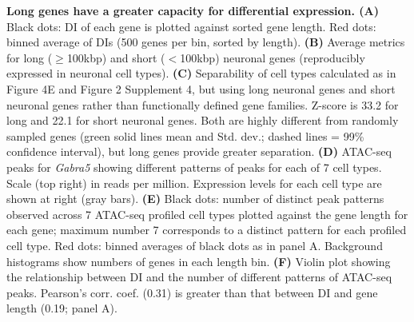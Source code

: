 \textbf{Long genes have a greater capacity for differential expression. (A)} Black dots: DI of each gene is plotted against sorted gene length. Red dots: binned average of DIs (500 genes per bin, sorted by length). \textbf{(B)} Average metrics for long ($\geq$100kbp) and short ($<$100kbp) neuronal genes (reproducibly expressed in neuronal cell types). \textbf{(C)} Separability of cell types calculated as in Figure 4E and Figure 2 Supplement 4, but using long neuronal genes and short neuronal genes rather than functionally defined gene families. Z-score is 33.2 for long and 22.1 for short neuronal genes. Both are highly different from randomly sampled genes (green solid lines mean and Std. dev.; dashed lines = 99\% confidence interval), but long genes provide greater separation. \textbf{(D)} ATAC-seq peaks for \textit{Gabra5} showing different patterns of peaks for each of 7 cell types. Scale (top right) in reads per million. Expression levels for each cell type are shown at right (gray bars). \textbf{(E)} Black dots: number of distinct peak patterns observed across 7 ATAC-seq profiled cell types plotted against the gene length for each gene; maximum number 7 corresponds to a distinct pattern for each profiled cell type. Red dots: binned averages of black dots as in panel A. Background histograms show numbers of genes in each length bin. \textbf{(F)} Violin plot showing the relationship between DI and the number of different patterns of ATAC-seq peaks. Pearson's corr. coef. (0.31) is greater than that between DI and gene length (0.19; panel A).  